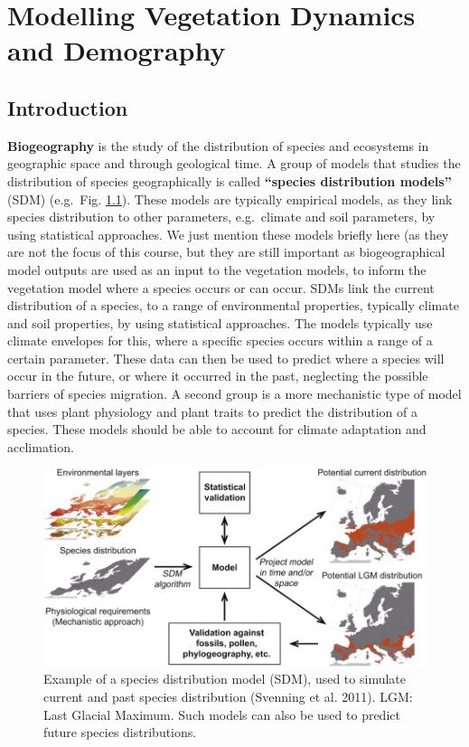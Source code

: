 \documentclass[12pt,oneside]{book}
\begin{document}
\chapter{Modelling Vegetation Dynamics and
Demography}\label{modelling-vegetation-dynamics-and-demography}


\section{Introduction}\label{introduction-2}

\textbf{Biogeography} is the study of the distribution of species and
ecosystems in geographic space and through geological time. A group of
models that studies the distribution of species geographically is called
\textbf{``species distribution models''} (SDM) (e.g.~Fig.
\ref{fig:f61}). These models are typically empirical models, as they
link species distribution to other parameters, e.g.~climate and soil
parameters, by using statistical approaches. We just mention these
models briefly here (as they are not the focus of this course, but they
are still important as biogeographical model outputs are used as an
input to the vegetation models, to inform the vegetation model where a
species occurs or can occur. SDMs link the current distribution of a
species, to a range of environmental properties, typically climate and
soil properties, by using statistical approaches. The models typically
use climate envelopes for this, where a specific species occurs within a
range of a certain parameter. These data can then be used to predict
where a species will occur in the future, or where it occurred in the
past, neglecting the possible barriers of species migration. A second
group is a more mechanistic type of model that uses plant physiology and
plant traits to predict the distribution of a species. These models
should be able to account for climate adaptation and acclimation.

\begin{figure}

{\centering \includegraphics[width=0.8\linewidth]{figures/chap6/f61_svenning_SDM} 

}

\caption{Example of a species distribution model (SDM), used to simulate current and past species distribution (Svenning et al. 2011). LGM: Last Glacial Maximum. Such models can also be used to predict future species distributions.}\label{fig:f61}
\end{figure}
\end{document}

